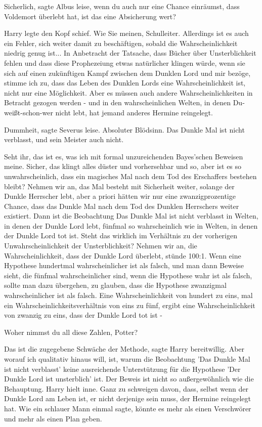 \glqq{}Sicherlich\grqq{}, sagte Albus leise, \glqq{}wenn du auch nur eine Chance
einräumst, dass Voldemort überlebt hat, ist das eine Absicherung wert?\grqq{}

Harry legte den Kopf schief. \glqq{}Wie Sie meinen, Schulleiter. Allerdings ist
es auch ein Fehler, sich weiter damit zu beschäftigen, sobald die
Wahrscheinlichkeit niedrig genug ist... In Anbetracht der Tatsache, dass Bücher
über Unsterblichkeit fehlen und dass diese Prophezeiung etwas natürlicher
klingen würde, wenn sie sich auf einen zukünftigen Kampf zwischen dem Dunklen
Lord und mir bezöge, stimme ich zu, dass das Leben des Dunklen Lords eine
Wahrscheinlichkeit ist, nicht nur eine Möglichkeit. Aber es müssen auch andere
Wahrscheinlichkeiten in Betracht gezogen werden - und in den wahrscheinlichen
Welten, in denen Du-weißt-schon-wer nicht lebt, hat jemand anderes Hermine
reingelegt.\grqq{}

\glqq{}Dummheit\grqq{}, sagte Severus leise. \glqq{}Absoluter Blödsinn. Das Dunkle
Mal ist nicht verblasst, und sein Meister auch nicht.\grqq{}

\glqq{}Seht ihr, das ist es, was ich mit formal unzureichenden Bayes'schen
Beweisen meine. Sicher, das klingt alles düster und vorhersehbar und so, aber
ist es so unwahrscheinlich, dass ein magisches Mal nach dem Tod des Erschaffers
bestehen bleibt? Nehmen wir an, das Mal besteht mit Sicherheit weiter, solange
der Dunkle Herrscher lebt, aber a priori hätten wir nur eine zwanzigprozentige
Chance, dass das Dunkle Mal nach dem Tod des Dunklen Herrschers weiter
existiert. Dann ist die Beobachtung \glqq{}Das Dunkle Mal ist nicht
verblasst\grqq{} in Welten, in denen der Dunkle Lord lebt, fünfmal so
wahrscheinlich wie in Welten, in denen der Dunkle Lord tot ist. Steht das
wirklich im Verhältnis zu der vorherigen Unwahrscheinlichkeit der
Unsterblichkeit? Nehmen wir an, die Wahrscheinlichkeit, dass der Dunkle Lord
überlebt, stünde 100:1. Wenn eine Hypothese hundertmal wahrscheinlicher ist als
falsch, und man dann Beweise sieht, die fünfmal wahrscheinlicher sind, wenn die
Hypothese wahr ist als falsch, sollte man dazu übergehen, zu glauben, dass die
Hypothese zwanzigmal wahrscheinlicher ist als falsch. Eine Wahrscheinlichkeit
von hundert zu eins, mal ein Wahrscheinlichkeitsverhältnis von eins zu fünf,
ergibt eine Wahrscheinlichkeit von zwanzig zu eins, dass der Dunkle Lord tot ist
-\grqq{}

\glqq{}Woher nimmst du all diese Zahlen, Potter?\grqq{}

\glqq{}Das ist die zugegebene Schwäche der Methode\grqq{}, sagte Harry
bereitwillig. \glqq{}Aber worauf ich qualitativ hinaus will, ist, warum die
Beobachtung 'Das Dunkle Mal ist nicht verblasst' keine ausreichende
Unterstützung für die Hypothese 'Der Dunkle Lord ist unsterblich' ist. Der
Beweis ist nicht so außergewöhnlich wie die Behauptung.\grqq{} Harry hielt inne.
\glqq{}Ganz zu schweigen davon, dass, selbst wenn der Dunkle Lord am Leben ist,
er nicht derjenige sein muss, der Hermine reingelegt hat. Wie ein schlauer Mann
einmal sagte, könnte es mehr als einen Verschwörer und mehr als einen Plan
geben.\grqq{}


